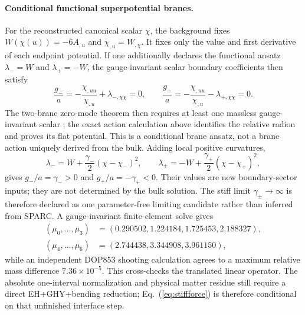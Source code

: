 \documentclass[10pt]{article}
\begin{document}
\paragraph{Conditional functional superpotential branes.}
For the reconstructed canonical scalar $\chi$, the background fixes
$W(\chi(u))=-6A_{,u}$ and $\chi_{,u}=W_{,\chi}$.  It fixes only the value
and first derivative of each endpoint potential.  If one additionally declares
the functional ansatz $\lambda_-=W$ and $\lambda_+=-W$, the gauge-invariant scalar boundary
coefficients then satisfy
\begin{equation}
 \frac{g_-}{a}=-\frac{\chi_{,uu}}{\chi_{,u}}+\lambda_{-,\chi\chi}=0,
 \qquad
 \frac{g_+}{a}=-\frac{\chi_{,uu}}{\chi_{,u}}-\lambda_{+,\chi\chi}=0.
 \label{eq:minimaljunctionzero}
\end{equation}
The two-brane zero-mode theorem then requires at least one massless
gauge-invariant scalar \citep{Lesgourgues2004}; the exact action calculation
above identifies the relative radion and proves its flat potential.  This is a
conditional brane ansatz, not a brane action uniquely derived from the bulk.
Adding local positive
curvatures,
\begin{equation}
 \lambda_-=W+\frac{\gamma_-}{2}(\chi-\chi_-)^2,
 \qquad
 \lambda_+=-W+\frac{\gamma_+}{2}(\chi-\chi_+)^2,
\end{equation}
gives $g_-/a=\gamma_->0$ and $g_+/a=-\gamma_+<0$.  Their values are new
boundary-sector inputs; they are not determined by the bulk solution.  The
stiff limit $\gamma_\pm\rightarrow\infty$ is therefore declared as one
parameter-free limiting candidate rather than inferred from SPARC.  A
gauge-invariant finite-element solve gives
\begin{align}
 (\mu_0,\ldots,\mu_3)&=(0.290502,1.224184,1.725453,2.188327),\nonumber\\
 (\mu_4,\ldots,\mu_6)&=(2.744438,3.344908,3.961150),
\end{align}
while an independent DOP853 shooting calculation agrees to a maximum relative
mass difference $7.36\times10^{-5}$.  This cross-checks the translated linear
operator.  The absolute one-interval normalization and physical matter residue
still require a direct EH+GHY+bending reduction; Eq.~(\ref{eq:stiffforce}) is
therefore conditional on that unfinished interface step.
\end{document}
